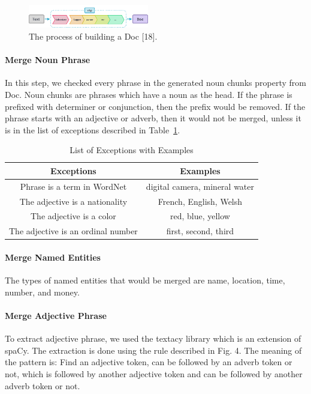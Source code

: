 \documentclass[a4paper,conference]{IEEEtran}
\begin{document}
\begin{figure}[htbp]
\centerline{\includegraphics[width=0.47\textwidth]{fig3.png}}
\caption{The process of building a Doc [18].}
\label{fig3}
\end{figure}

\paragraph{Merge Noun Phrase}
In this step, we checked every phrase in the generated noun chunks property from Doc. Noun chunks are phrases which have a noun as the head. If the phrase is prefixed with determiner or conjunction, then the prefix would be removed. If the phrase starts with an adjective or adverb, then it would not be merged, unless it is in the list of exceptions described in Table~\ref{tab1}. 

\begin{table}[htbp]
\caption{List of Exceptions with Examples}
\begin{center}
\begin{tabular}{|c|c|}
\hline
\textbf{Exceptions} & \textbf{Examples}\\
\hline
Phrase is a term in WordNet&digital camera, mineral water\\
\hline
The adjective is a nationality&French, English, Welsh\\
\hline
The adjective is a color&red, blue, yellow\\
\hline
The adjective is an ordinal number&first, second, third\\
\hline
\end{tabular}
\label{tab1}
\end{center}
\end{table}

\paragraph{Merge Named Entities}
The types of named entities that would be merged are name, location, time, number, and money.

\paragraph{Merge Adjective Phrase}
To extract adjective phrase, we used the textacy library which is an extension of spaCy. The extraction is done using the rule described in Fig. 4. The meaning of the pattern is: Find an adjective token, can be followed by an adverb token or not, which is followed by another adjective token and can be followed by another adverb token or not.
\end{document}
